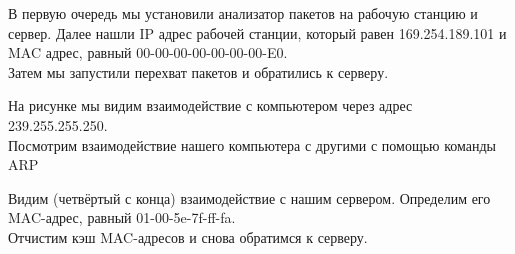 \documentclass[a4paper,12pt]{article}
\begin{document}
В первую очередь мы установили анализатор пакетов на рабочую станцию и сервер. Далее нашли IP 
адрес рабочей станции, который равен 169.254.189.101 и  MAC адрес, равный 00-00-00-00-00-00-00-E0.\\
Затем мы запустили перехват пакетов и обратились к серверу.
\begin{figure}[H]
\end{figure}

На рисунке мы видим взаимодействие с компьютером через адрес 239.255.255.250.\\
Посмотрим взаимодействие нашего компьютера с другими с помощью команды ARP 
\begin{figure}[H]
\end{figure}
Видим (четвёртый с конца) взаимодействие с нашим сервером.
Определим его MAC-адрес, равный 01-00-5e-7f-ff-fa.\\

Отчистим кэш MAC-адресов и снова обратимся к серверу.
\end{document}
